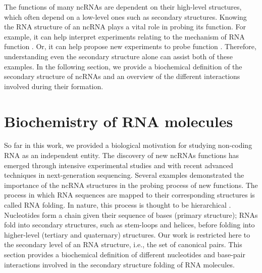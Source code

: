 The functions of many ncRNAs are dependent on their high-level structures, which often depend on a low-level ones such as secondary structures. Knowing the RNA structure of an ncRNA plays a vital role in probing its function. For example, it can help interpret experiments relating to the mechanism of RNA function \cite{flor1989conserved}. Or, it can help propose new experiments to probe function \cite{kim2007staufen1}. Therefore, understanding even the secondary structure alone can assist both of these examples. In the following section, we provide a biochemical definition of the secondary structure of ncRNAs and an overview of the different interactions involved during their formation. 


\section{Biochemistry of RNA molecules}\label{sec:rna_biochemical}

So far in this work, we provided a biological motivation for studying non-coding RNA as an independent entity. The discovery of new ncRNAs functions has emerged through intensive experimental studies and with recent advanced techniques in next-generation sequencing. Several examples demonstrated the importance of the ncRNA structures in the probing process of new functions. The process in which RNA sequences are mapped to their corresponding structures is called RNA folding. In nature, this process is thought to be hierarchical \cite{brion1997hierarchy,tinoco1999rna}. Nucleotides form a chain given their sequence of bases (primary structure); RNAs fold into secondary structures, such as stem-loops and helices, before folding into higher-level (tertiary and quaternary) structures. Our work is restricted here to the secondary level of an RNA structure, i.e., the set of canonical pairs. This section provides a biochemical definition of different nucleotides and base-pair interactions involved in the secondary structure folding of RNA molecules. 

